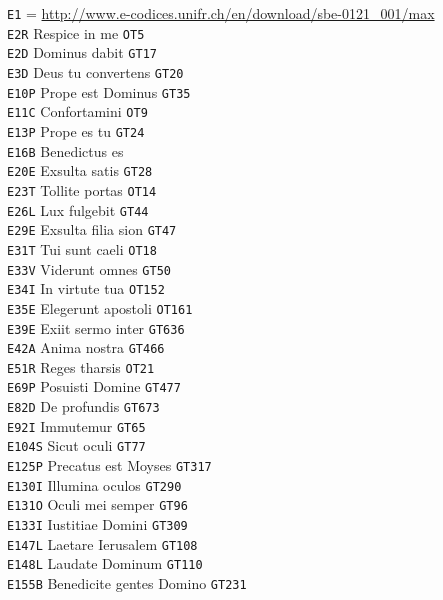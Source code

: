\documentclass[a4paper]{article}
\begin{document}
{\begin{multicols}{2}
\noindent
\texttt{E1} = \url{http://www.e-codices.unifr.ch/en/download/sbe-0121_001/max}\\
\texttt{E2R} Respice in me \texttt{OT5}\\
\texttt{E2D} Dominus dabit \texttt{GT17}\\
\texttt{E3D} Deus tu convertens \texttt{GT20}\\
\texttt{E10P} Prope est Dominus \texttt{GT35}\\
\texttt{E11C} Confortamini \texttt{OT9}\\
\texttt{E13P} Prope es tu \texttt{GT24}\\
\texttt{E16B} Benedictus es\\
\texttt{E20E} Exsulta satis \texttt{GT28}\\
\texttt{E23T} Tollite portas \texttt{OT14}\\
\texttt{E26L} Lux fulgebit \texttt{GT44}\\
\texttt{E29E} Exsulta filia sion \texttt{GT47}\\
\texttt{E31T} Tui sunt caeli \texttt{OT18}\\
\texttt{E33V} Viderunt omnes \texttt{GT50}\\
\texttt{E34I} In virtute tua \texttt{OT152}\\
\texttt{E35E} Elegerunt apostoli \texttt{OT161}\\
\texttt{E39E} Exiit sermo inter \texttt{GT636}\\
\texttt{E42A} Anima nostra \texttt{GT466}\\
\texttt{E51R} Reges tharsis \texttt{OT21}\\
\texttt{E69P} Posuisti Domine \texttt{GT477}\\
\texttt{E82D} De profundis \texttt{GT673}\\
\texttt{E92I} Immutemur \texttt{GT65}\\
\texttt{E104S} Sicut oculi \texttt{GT77}\\
\texttt{E125P} Precatus est Moyses \texttt{GT317}\\
\texttt{E130I} Illumina oculos \texttt{GT290}\\
\texttt{E131O} Oculi mei semper \texttt{GT96}\\
\texttt{E133I} Iustitiae Domini \texttt{GT309}\\
\texttt{E147L} Laetare Ierusalem \texttt{GT108}\\
\texttt{E148L} Laudate Dominum \texttt{GT110}\\
\texttt{E155B} Benedicite gentes Domino \texttt{GT231}\\

\end{multicols}}
\end{document}
